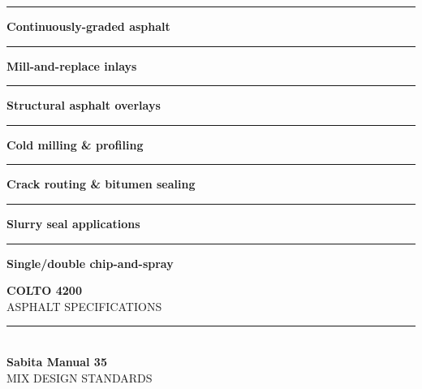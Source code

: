 \begin{minipage}[t]{0.34\textwidth}
    \vspace{0pt}
    \begin{tcolorbox}[
        enhanced, colback=mhoffwhite, colframe=mhnavy, boxrule=1pt, arc=4pt,
        title={\bfseries\color{white}\faLayerGroup\ Surfacing Scope of Work},
        colbacktitle=mhnavy, left=7pt, right=7pt, top=6pt, bottom=6pt,
        drop shadow=black!6
    ]
        \fontsize{8.1pt}{11.6pt}\selectfont
        \textcolor{mhnavy}{\rule{4pt}{4pt}}\hspace{4pt}\textbf{Continuously-graded asphalt}\\
        \textcolor{mhnavy}{\rule{4pt}{4pt}}\hspace{4pt}\textbf{Mill-and-replace inlays}\\
        \textcolor{mhnavy}{\rule{4pt}{4pt}}\hspace{4pt}\textbf{Structural asphalt overlays}\\
        \textcolor{mhnavy}{\rule{4pt}{4pt}}\hspace{4pt}\textbf{Cold milling \& profiling}\\
        \textcolor{mhnavy}{\rule{4pt}{4pt}}\hspace{4pt}\textbf{Crack routing \& bitumen sealing}\\
        \textcolor{mhnavy}{\rule{4pt}{4pt}}\hspace{4pt}\textbf{Slurry seal applications}\\
        \textcolor{mhnavy}{\rule{4pt}{4pt}}\hspace{4pt}\textbf{Single/double chip-and-spray}
    \end{tcolorbox}

    \vspace{0.20cm}

    \begin{tcolorbox}[
        enhanced, colback=white, colframe=mhlightgray, boxrule=0.8pt, arc=4pt,
        left=6pt, right=6pt, top=6pt, bottom=6pt, halign=center,
        drop shadow=black!4
    ]
        {\fontsize{18pt}{20pt}\selectfont\bfseries\color{mhblue}COLTO 4200}\\[1pt]
        {\fontsize{7.4pt}{9pt}\selectfont\color{mhtextmuted}\MakeUppercase{Asphalt Specifications}}\\[4pt]
        \textcolor{mhlightgray}{\rule{3.2cm}{0.6pt}}\\[4pt]
        {\fontsize{13pt}{15pt}\selectfont\bfseries\color{mhnavy}Sabita Manual 35}\\[1pt]
        {\fontsize{7.2pt}{9pt}\selectfont\color{mhtextmuted}\MakeUppercase{Mix Design Standards}}
    \end{tcolorbox}
\end{minipage}

